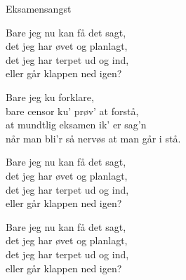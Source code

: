 \begin{song}{Eksamensangst}
  \begin{SBChorus}
    Bare jeg nu kan få det sagt,\\
    det jeg har øvet og planlagt,\\
    det jeg har terpet ud og ind,\\
    eller går klappen ned igen?
  \end{SBChorus}


  \begin{SBSection*}
    Bare jeg ku forklare,\\
    bare censor ku' prøv' at forstå,\\
    at mundtlig eksamen ik' er sag'n\\
    når man bli'r så nervøs at man går i stå.
  \end{SBSection*}

  \begin{SBChorus}
    Bare jeg nu kan få det sagt,\\
    det jeg har øvet og planlagt,\\
    det jeg har terpet ud og ind,\\
    eller går klappen ned igen?
  \end{SBChorus}

  \begin{SBChorus}
    Bare jeg nu kan få det sagt,\\
    det jeg har øvet og planlagt,\\
    det jeg har terpet ud og ind,\\
    eller går klappen ned igen?
  \end{SBChorus}


\end{song}